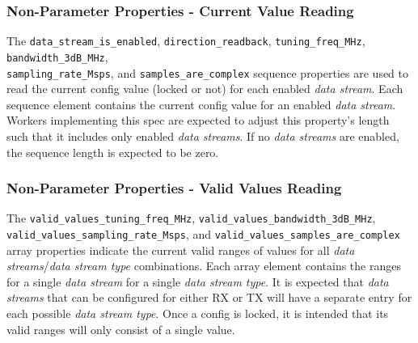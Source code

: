 \documentclass{article}
\begin{document}
  \subsubsection{Non-Parameter Properties - Current Value Reading}
  The
  \verb+data_stream_is_enabled+,
  \verb+direction_readback+,
  \verb+tuning_freq_MHz+,
  \verb+bandwidth_3dB_MHz+, \\
  \verb+sampling_rate_Msps+, and 
  \verb+samples_are_complex+
  sequence properties are used to read the current config value
  (locked or not) for each enabled \textit{data stream}. Each
  sequence element contains the current config value for an enabled
  \textit{data stream}.
  Workers implementing this spec are expected to adjust this property's
  length such that it includes only enabled
  \textit{data streams}.
  If no
  \textit{data streams}
  are enabled, the sequence length is expected to be zero.

  \subsubsection{Non-Parameter Properties - Valid Values Reading}
  The
  \verb+valid_values_tuning_freq_MHz+,
  \verb+valid_values_bandwidth_3dB_MHz+,
  \verb+valid_values_sampling_rate_Msps+, and
  \verb+valid_values_samples_are_complex+
  array properties indicate the current valid ranges of
  values for all \textit{data streams}/\textit{data stream type}
  combinations.
  Each array element contains the
  ranges for a single \textit{data stream} for a single
  \textit{data stream type}.
  It is expected that \textit{data streams} that can be configured for either
  RX or TX will have a separate entry for each possible
  \textit{data stream type}.
  Once a config is locked, it
  is intended that its valid ranges will only consist of a single value.
\end{document}
